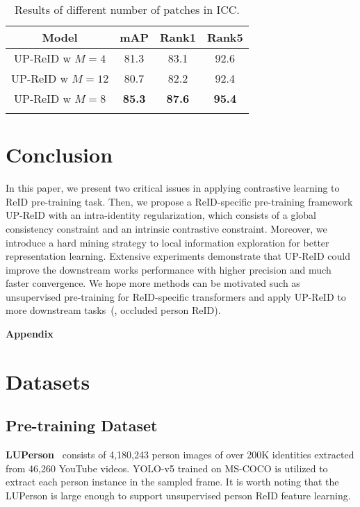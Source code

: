 \documentclass[10pt,twocolumn,letterpaper]{article}
\begin{document}
\vspace{-1mm}
\begin{table}[h!]
\caption{Results of different number of patches in ICC.}
\vspace{-1mm}
    \centering
    \begin{tabular}{c|ccc}
        \shline
        Model & mAP & Rank1 & Rank5 \\
        \hline
        UP-ReID w $M=4$ & 81.3 & 83.1 & 92.6 \\
        UP-ReID w $M=12$ & 80.7 & 82.2 & 92.4 \\
        UP-ReID w $M=8$ & \textbf{85.3} & \textbf{87.6} & \textbf{95.4} \\
        \shline
    \end{tabular}
    \label{tab: different number patches.}
    \vspace{-5mm}
\end{table}


\section{Conclusion}
In this paper, we present two critical issues in applying contrastive learning to ReID pre-training task. Then, we propose a ReID-specific pre-training framework UP-ReID with an intra-identity regularization, which consists of a global consistency constraint and an intrinsic contrastive constraint. Moreover, we introduce a hard mining strategy to local information exploration for better representation learning. Extensive experiments demonstrate that UP-ReID could improve the downstream works performance with higher precision and much faster convergence. We hope more methods can be motivated such as unsupervised pre-training for ReID-specific transformers and apply UP-ReID to more downstream tasks~(\eg, occluded person ReID).


{\small


}

\newpage
\appendix

\noindent\textbf{\Large Appendix}

\section{Datasets}
\subsection{Pre-training Dataset}
\noindent\textbf{LUPerson}~\cite{fu2021unsupervised} consists of 4,180,243 person images of over 200K identities extracted from 46,260 YouTube videos. YOLO-v5 trained on MS-COCO is utilized to extract each person instance in the sampled frame. It is worth noting that the LUPerson is large enough to support unsupervised person ReID feature learning.
\end{document}
